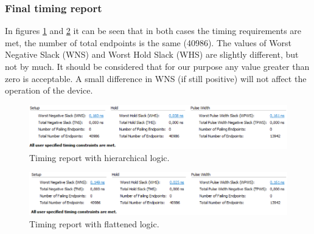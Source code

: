 \subsubsection{Final timing report}
\noindent In figures \ref{fig:noflattiming} and \ref{fig:flattiming} it can be seen that in both cases the timing requirements are met, the number of total endpoints is the same (40986). The values of Worst Negative Slack (WNS) and Worst Hold Slack (WHS) are slightly different, but not by much. It should be considered that for our purpose any value greater than zero is acceptable.
A small difference in WNS (if still positive) will not affect the operation of the device.  
\begin{figure}[H]
	\centering
	\includegraphics[width=0.8\linewidth]{IMG/ch4/FirmwareNOFLAT/TIMING}
	\caption{Timing report with hierarchical logic.}
	\label{fig:noflattiming}
\end{figure}

\begin{figure}[H]
	\centering
	\includegraphics[width=0.8\linewidth]{IMG/ch4/FirmwareFLAT/TIMING}
	\caption{Timing report with flattened logic.}
	\label{fig:flattiming}
\end{figure}

